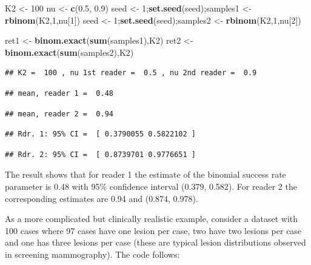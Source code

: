 \documentclass[
]{book}
\newenvironment{Shaded}{\begin{snugshade}}{\end{snugshade}}
\newcommand{\DecValTok}[1]{\textcolor[rgb]{0.00,0.00,0.81}{#1}}
\newcommand{\FloatTok}[1]{\textcolor[rgb]{0.00,0.00,0.81}{#1}}
\newcommand{\KeywordTok}[1]{\textcolor[rgb]{0.13,0.29,0.53}{\textbf{#1}}}
\newcommand{\NormalTok}[1]{#1}
\newcommand{\StringTok}[1]{\textcolor[rgb]{0.31,0.60,0.02}{#1}}
\begin{document}
\begin{Shaded}
\begin{Highlighting}[]
\NormalTok{K2 <-}\StringTok{ }\DecValTok{100}
\NormalTok{nu <-}\StringTok{ }\KeywordTok{c}\NormalTok{(}\FloatTok{0.5}\NormalTok{, }\FloatTok{0.9}\NormalTok{)}
\NormalTok{seed <-}\StringTok{ }\DecValTok{1}\NormalTok{;}\KeywordTok{set.seed}\NormalTok{(seed);samples1 <-}\StringTok{ }\KeywordTok{rbinom}\NormalTok{(K2,}\DecValTok{1}\NormalTok{,nu[}\DecValTok{1}\NormalTok{])}
\NormalTok{seed <-}\StringTok{ }\DecValTok{1}\NormalTok{;}\KeywordTok{set.seed}\NormalTok{(seed);samples2 <-}\StringTok{ }\KeywordTok{rbinom}\NormalTok{(K2,}\DecValTok{1}\NormalTok{,nu[}\DecValTok{2}\NormalTok{])}

\NormalTok{ret1 <-}\StringTok{ }\KeywordTok{binom.exact}\NormalTok{(}\KeywordTok{sum}\NormalTok{(samples1),K2)}
\NormalTok{ret2 <-}\StringTok{ }\KeywordTok{binom.exact}\NormalTok{(}\KeywordTok{sum}\NormalTok{(samples2),K2)}
\end{Highlighting}
\end{Shaded}

\begin{verbatim}
## K2 =  100 , nu 1st reader =  0.5 , nu 2nd reader =  0.9
\end{verbatim}

\begin{verbatim}
## mean, reader 1 =  0.48
\end{verbatim}

\begin{verbatim}
## mean, reader 2 =  0.94
\end{verbatim}

\begin{verbatim}
## Rdr. 1: 95% CI =  [ 0.3790055 0.5822102 ]
\end{verbatim}

\begin{verbatim}
## Rdr. 2: 95% CI =  [ 0.8739701 0.9776651 ]
\end{verbatim}

The result shows that for reader 1 the estimate of the binomial success rate parameter is 0.48 with 95\% confidence interval (0.379, 0.582). For reader 2 the corresponding estimates are 0.94 and (0.874, 0.978).

As a more complicated but clinically realistic example, consider a dataset with 100 cases where 97 cases have one lesion per case, two have two lesions per case and one has three lesions per case (these are typical lesion distributions observed in screening mammography). The code follows:
\end{document}
